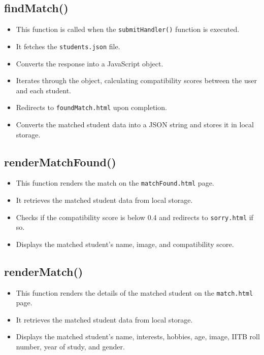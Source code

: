 \documentclass[12pt,a4paper]{article}
\begin{document}
\subsection{findMatch()}
\begin{itemize}
    \item This function is called when the \texttt{submitHandler()} function is executed.
    \item It fetches the \texttt{students.json} file.
    \item Converts the response into a JavaScript object.
    \item Iterates through the object, calculating compatibility scores between the user and each student.
    \item Redirects to \texttt{foundMatch.html} upon completion.
    \item Converts the matched student data into a JSON string and stores it in local storage.
\end{itemize}

\subsection{renderMatchFound()}
\begin{itemize}
    \item This function renders the match on the \texttt{matchFound.html} page.
    \item It retrieves the matched student data from local storage.
    \item Checks if the compatibility score is below 0.4 and redirects to \texttt{sorry.html} if so.
    \item Displays the matched student's name, image, and compatibility score.
\end{itemize}

\subsection{renderMatch()}
\begin{itemize}
    \item This function renders the details of the matched student on the \texttt{match.html} page.
    \item It retrieves the matched student data from local storage.
    \item Displays the matched student's name, interests, hobbies, age, image, IITB roll number, year of study, and gender.
\end{itemize}
\end{document}
